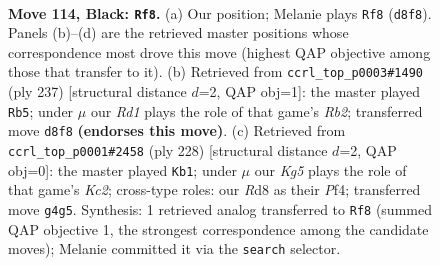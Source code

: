 \documentclass[11pt]{article}
\begin{document}
\clearpage

\begin{figure}[p]\centering
\begin{subfigure}{0.46\textwidth}\centering
\resizebox{\linewidth}{!}{%
\newchessgame
\chessboard[
  setfen={3r4/7K/8/8/6k1/8/8/8 b - - 13 114},
  showmover=false,
  pgfstyle=straightmove, color=movearrow, markmove={d8-f8}
]}
\caption{}
\end{subfigure}\hfill
\begin{subfigure}{0.46\textwidth}\centering
\resizebox{\linewidth}{!}{%
\newchessgame
\chessboard[
  setfen={8/1r6/3K4/8/k7/8/4Q3/8 b - - 14 119},
  showmover=false,
  pgfstyle=straightmove, color=movearrow, markmove={b7-b5}
]}
\caption{}
\end{subfigure}
\\[4pt]
\begin{subfigure}{0.46\textwidth}\centering
\resizebox{\linewidth}{!}{%
\newchessgame
\chessboard[
  setfen={8/8/8/2k5/5P2/8/2K5/8 w - - 0 115},
  showmover=false,
  pgfstyle=straightmove, color=movearrow, markmove={c2-b1}
]}
\caption{}
\end{subfigure}\hfill

\caption{\textbf{Move 114, Black: \texttt{Rf8}.} (a) Our position; Melanie plays \texttt{Rf8} (\texttt{d8f8}). Panels (b)--(d) are the retrieved master positions whose correspondence most drove this move (highest QAP objective among those that transfer to it). (b) Retrieved from \texttt{ccrl\_top\_p0003\#1490} (ply 237) [structural distance $d$=2, QAP obj=1]: the master played \texttt{Rb5}; under $\mu$ our \emph{Rd1} plays the role of that game's \emph{Rb2}; transferred move \texttt{d8f8} \textbf{(endorses this move)}. (c) Retrieved from \texttt{ccrl\_top\_p0001\#2458} (ply 228) [structural distance $d$=2, QAP obj=0]: the master played \texttt{Kb1}; under $\mu$ our \emph{Kg5} plays the role of that game's \emph{Kc2}; cross-type roles: our \emph{R}d8 as their \emph{P}f4; transferred move \texttt{g4g5}. Synthesis: 1 retrieved analog transferred to \texttt{Rf8} (summed QAP objective 1, the strongest correspondence among the candidate moves); Melanie committed it via the \texttt{search} selector.}
\label{fig:thought-m227}
\end{figure}

\clearpage
\end{document}

